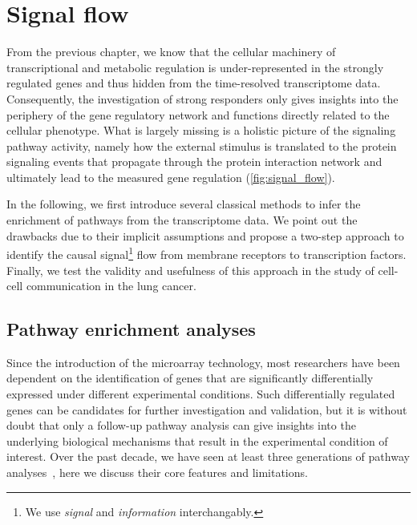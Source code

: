 \chapter{Signal flow}
\label{chap:flow}

From the previous chapter, we know that the cellular machinery of 
transcriptional and metabolic regulation is under-represented in the strongly 
regulated genes and thus hidden from the time-resolved transcriptome data. 
Consequently, the investigation of strong responders only gives insights into
the periphery of the gene regulatory network and functions directly related
to the cellular phenotype. What is largely missing is a holistic picture of
the signaling pathway activity, namely how the external stimulus is translated
to the protein signaling events that propagate through the protein interaction
network and ultimately lead to the measured gene regulation (\ref{fig:signal_flow}).

In the following, we first introduce several classical methods to infer the
enrichment of pathways from the transcriptome data. We point out the drawbacks
due to their implicit assumptions and propose a two-step approach to identify the
causal signal\footnote{We use \emph{signal} and \emph{information} interchangably.} 
flow from membrane receptors to transcription factors. Finally,
we test the validity and usefulness of this approach in the study of cell-cell communication in the lung
cancer.

\section{Pathway enrichment analyses}
Since the introduction of the microarray technology, 
most researchers have been dependent on the identification
of genes that are significantly differentially expressed
under different experimental conditions.
Such differentially regulated genes can be candidates for 
further investigation and validation, but it is without
doubt that only a follow-up
pathway analysis can give insights into the underlying 
biological mechanisms that result in 
the experimental condition of interest. Over the past decade, we have seen at least 
three generations of pathway analyses~\citep{Khatri2012}, here we discuss 
their core features and limitations.

